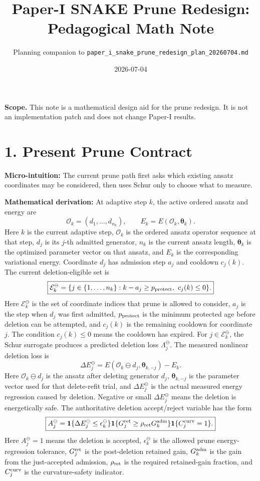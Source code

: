 \documentclass[10pt,twocolumn]{article}
\newcommand{\blk}[1]{\vspace{3pt}\noindent\textbf{#1:}\quad}
\newcommand{\Ek}{E_k}
\newcommand{\Ok}{\mathcal O_k}
\newcommand{\Edel}{\mathcal E_k^{\ominus}}
\newcommand{\Lam}{\Lambda_j^{\ominus}}
\newcommand{\dEdel}{\Delta E_j^{\ominus}}
\begin{document}
\title{\vspace{-2em}Paper-I SNAKE Prune Redesign: Pedagogical Math Note}
\author{Planning companion to \texttt{paper\_i\_snake\_prune\_redesign\_plan\_20260704.md}}
\date{2026-07-04}
\maketitle
\vspace{-1.2em}

\textbf{Scope.} This note is a mathematical design aid for the prune redesign. It is not an implementation patch and does not change Paper-I results.

\section*{1. Present Prune Contract}

\blk{Micro-intuition}
The current prune path first asks which existing ansatz coordinates may be considered, then uses Schur only to choose what to measure.

\blk{Mathematical derivation}
At adaptive step \(k\), the active ordered ansatz and energy are
\[
\Ok=(d_1,\ldots,d_{n_k}),
\qquad
\Ek=E(\Ok,\boldsymbol\theta_k).
\]
Here \(k\) is the current adaptive step, \(\Ok\) is the ordered ansatz operator sequence at that step, \(d_j\) is its \(j\)-th admitted generator, \(n_k\) is the current ansatz length, \(\boldsymbol\theta_k\) is the optimized parameter vector on that ansatz, and \(\Ek\) is the corresponding variational energy.
Coordinate \(d_j\) has admission step \(a_j\) and cooldown \(c_j(k)\). The current deletion-eligible set is
\[
\boxed{
\Edel=
\{j\in\{1,\ldots,n_k\}: k-a_j\ge p_{\rm protect},\ c_j(k)\le 0\}.
}
\]
Here \(\Edel\) is the set of coordinate indices that prune is allowed to consider, \(a_j\) is the step when \(d_j\) was first admitted, \(p_{\rm protect}\) is the minimum protected age before deletion can be attempted, and \(c_j(k)\) is the remaining cooldown for coordinate \(j\). The condition \(c_j(k)\le0\) means the cooldown has expired.
For \(j\in\Edel\), the Schur surrogate produces a predicted deletion loss \(\Lam\). The measured nonlinear deletion loss is
\[
\boxed{
\dEdel
=
E(\Ok\ominus d_j,\boldsymbol\theta_{k,-j})-\Ek .
}
\]
Here \(\Ok\ominus d_j\) is the ansatz after deleting generator \(d_j\), \(\boldsymbol\theta_{k,-j}\) is the parameter vector used for that delete-refit trial, and \(\dEdel\) is the actual measured energy regression caused by deletion. Negative or small \(\dEdel\) means the deletion is energetically safe.
The authoritative deletion accept/reject variable has the form
\[
\boxed{
A_j^\ominus
=
\mathbf 1\{\dEdel\le\epsilon_k^\ominus\}
\mathbf 1\{G_j^{\rm ret}\ge\rho_{\rm ret}G_k^{\rm adm}\}
\mathbf 1\{C_j^{\rm curv}=1\}.
}
\]
Here \(A_j^\ominus=1\) means the deletion is accepted, \(\epsilon_k^\ominus\) is the allowed prune energy-regression tolerance, \(G_j^{\rm ret}\) is the post-deletion retained gain, \(G_k^{\rm adm}\) is the gain from the just-accepted admission, \(\rho_{\rm ret}\) is the required retained-gain fraction, and \(C_j^{\rm curv}\) is the curvature-safety indicator.
\end{document}
